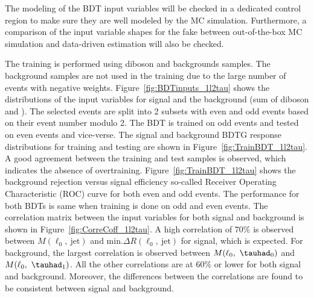 The modeling of the BDT input variables will be checked in a dedicated control region to make sure they are well modeled by the MC simulation. Furthermore, a comparison of the input variable shapes for the fake \tauh between out-of-the-box MC simulation and data-driven estimation will also be checked.

The training is performed using diboson and \ttbar backgrounds samples. The \vjet background samples are not used in the training due to the large number of events with negative weights. Figure~\ref{fig:BDTinputs_1l2tau} shows the distributions of the input variables for signal and the background (sum of diboson and \ttbar). The selected events are split into 2 subsets with even and odd events based on their event number modulo 2. The BDT is trained on odd events and tested on even events and vice-verse. The signal and background BDTG response distributions for training and testing are shown in Figure~\ref{fig:TrainBDT_1l2tau}. A good agreement between the training and test samples is observed, which indicates the absence of overtraining. Figure~\ref{fig:TrainBDT_1l2tau} shows the background rejection versus signal efficiency so-called Receiver Operating Characteristic (ROC) curve for both even and odd events. The performance for both BDTs is same when training is done on odd and even events. The correlation matrix between the input variables for both signal and background is shown in Figure~\ref{fig:CorreCoff_1l2tau}. A high correlation of $70\%$ is observed between $M(\ell_{0},~\mathrm{jet})$ and min.$\Delta R(\ell_{0},~\mathrm{jet})$ for signal, which is expected. For background, the largest correlation is observed between $M(\ell_{0},~\tauhad_{0})$ and $M(\ell_{0},~\tauhad_{1})$. All the other correlations are at $60\%$ or lower for both signal and background. Moreover, the differences between the correlations are found to be consistent between signal and background.

